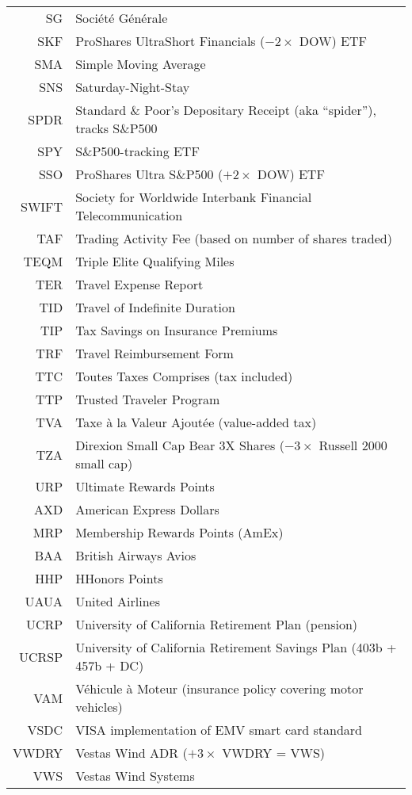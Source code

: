\documentclass[12pt,twoside]{article}
\begin{document}
\begin{longtable}[>{\bfseries}l]{>{\ttfamily}r l}
SG & Soci\'{e}t\'{e} G\'{e}n\'{e}rale \\
SKF & ProShares UltraShort Financials ($-2 \times$ DOW) ETF \\
SMA & Simple Moving Average \\
SNS & Saturday-Night-Stay \\
SPDR & Standard \& Poor's Depositary Receipt (aka ``spider''), tracks S\&P500 \\
SPY & S\&P500-tracking ETF \\
SSO & ProShares Ultra S\&P500 ($+2 \times$ DOW) ETF \\
SWIFT & Society for Worldwide Interbank Financial Telecommunication \\
TAF & Trading Activity Fee (based on number of shares traded) \\
TEQM & Triple Elite Qualifying Miles \\
TER & Travel Expense Report \\
TID & Travel of Indefinite Duration \\
TIP & Tax Savings on Insurance Premiums \\
TRF & Travel Reimbursement Form \\
TTC & Toutes Taxes Comprises (tax included) \\
TTP & Trusted Traveler Program \\
TVA & Taxe \`{a} la Valeur Ajout\'{e}e (value-added tax) \\
TZA & Direxion Small Cap Bear 3X Shares ($-3 \times$ Russell 2000 small cap)\\
URP & Ultimate Rewards Points \\
AXD & American Express Dollars \\
MRP & Membership Rewards Points (AmEx) \\
BAA & British Airways Avios \\
HHP & HHonors Points \\
UAUA & United Airlines \\
UCRP & University of California Retirement Plan (pension) \\
UCRSP & University of California Retirement Savings Plan (403b + 457b + DC)\\
VAM & V\'{e}hicule \`{a} Moteur (insurance policy covering motor vehicles) \\
VSDC & VISA implementation of EMV smart card standard \\
VWDRY & Vestas Wind ADR ($+3 \times$ VWDRY = VWS) \\
VWS & Vestas Wind Systems \\

\end{longtable}
\end{document}
